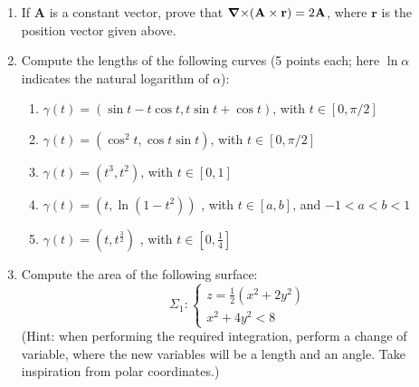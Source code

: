 \documentclass[fleqn]{article}
\newcommand{\grad}[1]{\mbox{\boldmath $\nabla$}\mbox{$#1$}}
\begin{document}
\begin{enumerate}
    \item If $\mathbf{A}$ is a constant vector, prove that $\mathbf{\grad \times (A \times r)} =2 \mathbf{A}$, where $\mathbf{r}$ is the position vector given above.
    
    
    \item Compute the lengths of the following curves (5 points each; here $\ln \alpha$ indicates the natural logarithm of $\alpha$): 
    
      \begin{enumerate}
      \item 
      $\gamma(t)=(\sin t-t\cos t,t\sin t+\cos t)$,  with $t\in [0,\pi/2]$  
      \item $\gamma(t) =  (\cos^2 t,\cos t \sin t )$,    with 
      $t \in  [0, \pi/2]$    
      \item  $\gamma(t)=(t^3,t^2)$, with $ t\in[0,1] $    
      \item  $\gamma(t)= (t,\ln (1-t^2))$ , with $ t\in [a,b]$, and $-1<a<b<1 $ 
      \item  $\gamma(t)=(t,t^{\frac{3}{2}})$ , with $t\in [0,\frac{1}{4}]$ 
      
      \end{enumerate}
    
    \item Compute the area of the following surface: 
      \begin{equation}
      \Sigma_1 : \begin{cases}
                    z=\frac{1}{2}\left( x^2+2y^2 \right)  \\
                    x^2+4y^2<8
                  \end{cases}
                  \nonumber
      \end{equation}
    (Hint: when performing the required integration, perform a change of variable, where the new variables will be a length and an angle. Take inspiration from polar coordinates.)
    
  \end{enumerate}
\end{document}

